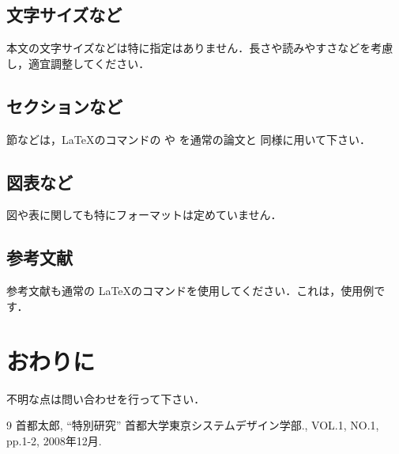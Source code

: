 \documentclass{ltjsarticle}
\begin{document}
\subsection{文字サイズなど}
本文の文字サイズなどは特に指定はありません．長さや読みやすさなどを考慮し，適宜調整してください．
\subsection{セクションなど}
節などは，\LaTeX のコマンドの  や  を通常の論文と
同様に用いて下さい．


\subsection{図表など}
図や表に関しても特にフォーマットは定めていません．

\subsection{参考文献}
参考文献も通常の \LaTeX のコマンドを使用してください．これは，使用例です\cite{tarou1}．
\section{おわりに}
不明な点は問い合わせを行って下さい．



\begin{thebibliography}{9}\footnotesize
{} 首都太郎, ``特別研究'' 首都大学東京システムデザイン学部., VOL.1, NO.1,
	 pp.1-2, 2008年12月.

\end{thebibliography}
%
\end{document}
